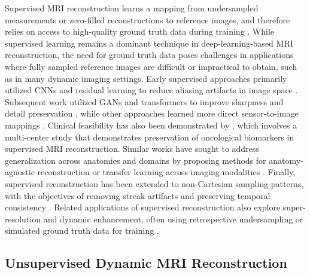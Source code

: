 \documentclass[runningheads]{llncs}
\begin{document}
Supervised MRI reconstruction learns a mapping from undersampled measurements or zero-filled reconstructions to reference images, and therefore relies on access to high-quality ground truth data during training \cite{Hossain2024DeepLearningMRI,Singh2023FastMRIReview,Heckel2024DeepLearningMRI}. While supervised learning remains a dominant technique in deep-learning-based MRI reconstruction, the need for ground truth data poses challenges in applications where fully sampled reference images are difficult or impractical to obtain, such as in many dynamic imaging settings. Early supervised approaches primarily utilized CNNs and residual learning to reduce aliasing artifacts in image space \cite{Hyun2018DeepLearningMRI,CHATTERJEE2022105321}. Subsequent work utilized GANs and transformers to improve sharpness and detail preservation \cite{LIU202277,Huang2022EdgeEnhancedFastMRI,NOOR2024106218,HUANG2022281}, while other approaches learned more direct sensor-to-image mappings \cite{Zhu2018DomainTransformMRI}. Clinical feasibility has also been demonstrated by \cite{Rastogi2024DeepLearningMRI}, which involves a multi-center study that demonstrates preservation of oncological biomarkers in supervised MRI reconstruction. Similar works have sought to address generalization across anatomies and domains by proposing methods for anatomy-agnostic reconstruction \cite{10.1007/978-3-030-87231-1_21} or transfer learning across imaging modalities \cite{Han2018DomainAdaptationMRI}. Finally, supervised reconstruction has been extended to non-Cartesian sampling patterns, with the objectives of removing streak artifacts and preserving temporal consistency \cite{Hauptmann2018RealtimeCMR,Kofler2019SpatioTemporalMRI,Shen2020PCNNRealtimeMRI,Jafari2022GRASPnetDCE,CHATTERJEE2022105321}. Related applications of supervised reconstruction also explore super-resolution and dynamic enhancement, often using retrospective undersampling or simulated ground truth data for training  \cite{LYU2024103142,SARASAEN2021102196,Chatterjee2024DDoSUNet,10.1007/978-3-030-32251-9_77}. 

\subsection{Unsupervised Dynamic MRI Reconstruction}
\end{document}
